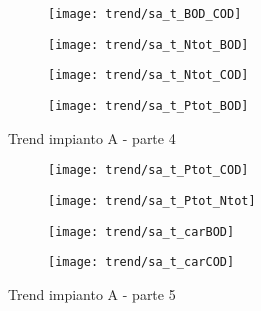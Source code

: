 \begin{sidewaysfigure}[h]\ContinuedFloat
	\renewcommand*\thesubfigure{(\arabic{subfigure})}
	\begin{subfigure}{0.49\textwidth}
		\texttt{[image: trend/sa\_t\_BOD\_COD]}
		\caption{}
		\centering
	\end{subfigure}
	\begin{subfigure}{0.49\textwidth}
		\texttt{[image: trend/sa\_t\_Ntot\_BOD]}
		\caption{}
		\centering
	\end{subfigure}

	\begin{subfigure}{0.49\textwidth}
		\texttt{[image: trend/sa\_t\_Ntot\_COD]}
		\caption{}
		\centering
	\end{subfigure}
	\begin{subfigure}{0.49\textwidth}
		\texttt{[image: trend/sa\_t\_Ptot\_BOD]}	
		\caption{}
		\centering
	\end{subfigure}
	\caption{Trend impianto A - parte 4}
\end{sidewaysfigure}

\begin{sidewaysfigure}[h]\ContinuedFloat
	\renewcommand*\thesubfigure{(\arabic{subfigure})}
	\begin{subfigure}{0.49\textwidth}
		\texttt{[image: trend/sa\_t\_Ptot\_COD]}
		\caption{}
		\centering
	\end{subfigure}
	\begin{subfigure}{0.49\textwidth}
		\texttt{[image: trend/sa\_t\_Ptot\_Ntot]}
		\caption{}
		\centering
	\end{subfigure}

	\begin{subfigure}{0.49\textwidth}
		\texttt{[image: trend/sa\_t\_carBOD]}
		\caption{}
		\label{fig:sa_t_carBOD}
		\centering
	\end{subfigure}
	\begin{subfigure}{0.49\textwidth}
		\texttt{[image: trend/sa\_t\_carCOD]}	
		\caption{}
		\label{fig:sa_t_carCOD}
		\centering
	\end{subfigure}
	\caption{Trend impianto A - parte 5}
\end{sidewaysfigure}


